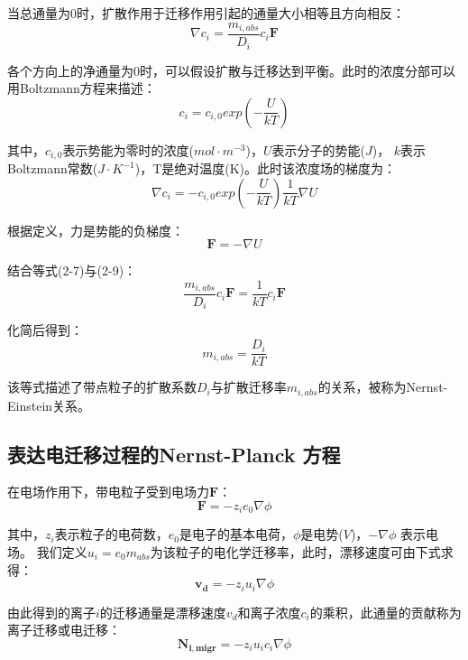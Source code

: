 当总通量为$0$时，扩散作用于迁移作用引起的通量大小相等且方向相反：
\begin{equation}
    \nabla{c_i}=\frac{m_{i,abs}}{D_i}c_i\mathbf{F}
\end{equation}

各个方向上的净通量为$0$时，可以假设扩散与迁移达到平衡。此时的浓度分部可以用Boltzmann方程来描述：
\begin{equation}
    c_i=c_{i,0}exp(-\frac{U}{kT})
\end{equation}

其中，$c_{i,0}$表示势能为零时的浓度($mol\cdot{m^{-3}}$)，$U$表示分子的势能($J$)，
$k$表示Boltzmann常数($J\cdot{K^{-1}}$)，T是绝对温度(K)。此时该浓度场的梯度为：
\begin{equation}
    \nabla{c_i}=-c_{i,0}exp(-\frac{U}{kT})\frac{1}{kT}\nabla{U}
\end{equation}

根据定义，力是势能的负梯度：
\begin{equation}
    \mathbf{F}=-\nabla{U}
\end{equation}

结合等式(2-7)与(2-9)：
\begin{equation}
    \frac{m_{i,abs}}{D_i}c_i\mathbf{F}=\frac{1}{kT}c_i\mathbf{F}
\end{equation}

化简后得到：
\begin{equation}
    m_{i,abs}=\frac{D_i}{kT}
    \label{Nernst-Einstein}
\end{equation}

该等式描述了带点粒子的扩散系数$D_i$与扩散迁移率$m_{i,abs}$的关系，被称为Nernst-Einstein关系\cite{Mehrer2007,CONWAY1972250}。
\subsection{表达电迁移过程的Nernst-Planck 方程}
在电场作用下，带电粒子受到电场力$\mathbf{F}$：
\begin{equation}
    \mathbf{F}=-z_ie_0\nabla\phi
\end{equation}

其中，$z_i$表示粒子的电荷数，$e_0$是电子的基本电荷，$\phi$是电势($V$)，$−\nabla{\phi}$ 表示电场。
我们定义$u_i=e_0m_{abs}$为该粒子的电化学迁移率，此时，漂移速度可由下式求得：
\begin{equation}
   \mathbf{v_d}=-z_iu_i\nabla\phi
\end{equation}

由此得到的离子$i$的迁移通量是漂移速度$v_d$和离子浓度$c_i$的乘积，此通量的贡献称为离子迁移或电迁移：
\begin{equation}
    \mathbf{N_{i,migr}}=-z_iu_ic_i\nabla\phi
\end{equation}

